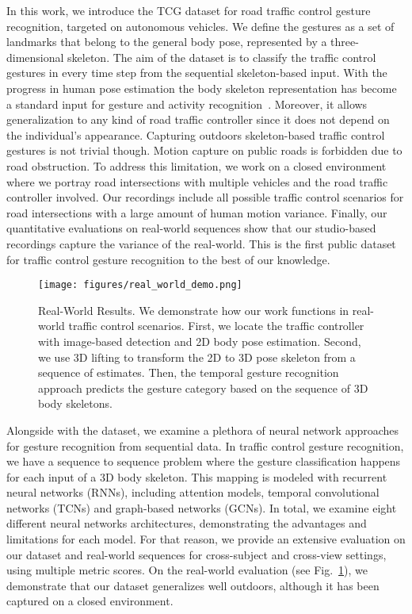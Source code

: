 \documentclass[letterpaper, 10 pt, conference]{ieeeconf}
\begin{document}
In this work, we introduce the TCG dataset for road traffic control gesture recognition, targeted on autonomous vehicles. We define the gestures as a set of landmarks that belong to the general body pose, represented by a three-dimensional skeleton. The aim of the dataset is to classify the traffic control gestures in every time step from the sequential skeleton-based input. With the progress in human pose estimation \cite{Belagiannis2014HolisticForests, belagiannis20153d, Belagiannis2017RecurrentEstimation} the body skeleton representation has become a standard input for gesture and activity recognition~\cite{jhuang2013towards, de2016skeleton, Nunez2017ConvolutionalRecognition}. Moreover, it allows generalization to any kind of road traffic controller since it does not depend on the individual's appearance. Capturing outdoors skeleton-based traffic control gestures is not trivial though. Motion capture on public roads is forbidden due to road obstruction. To address this limitation, we work on a closed environment where we portray road intersections with multiple vehicles and the road traffic controller involved. Our recordings include all possible traffic control scenarios for road intersections with a large amount of human motion variance. Finally, our quantitative evaluations on real-world sequences show that our studio-based recordings capture the variance of the real-world. This is the first public dataset for traffic control gesture recognition to the best of our knowledge.

\begin{figure}[t]
    \centering
    \texttt{[image: figures/real\_world\_demo.png]}
    \caption{Real-World Results. We demonstrate how our work functions in real-world traffic control scenarios. First, we locate the traffic controller with image-based detection and 2D body pose estimation. Second, we use 3D lifting to transform the 2D to 3D pose skeleton from a sequence of estimates. Then, the temporal gesture recognition approach predicts the gesture category based on the sequence of 3D body skeletons.}
    \label{fig:real_world_demo}
\end{figure}

Alongside with the dataset, we examine a plethora of neural network approaches for gesture recognition from sequential data. In traffic control gesture recognition, we have a sequence to sequence problem where the gesture classification happens for each input of a 3D body skeleton. This mapping is modeled with recurrent neural networks (RNNs), including attention models, temporal convolutional networks (TCNs) and graph-based networks (GCNs). In total, we examine eight different neural networks architectures, demonstrating the advantages and limitations for each model. For that reason, we provide an extensive evaluation on our dataset and real-world sequences for cross-subject and cross-view settings, using multiple metric scores. On the real-world evaluation (see Fig.~\ref{fig:real_world_demo}), we demonstrate that our dataset generalizes well outdoors, although it has been captured on a closed environment.
\end{document}
